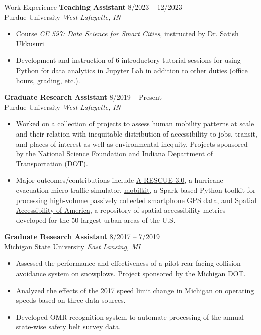 \documentclass{CV} %
\begin{document}
\begin{rSection}{Work Experience}
    {\bf Teaching Assistant} \hfill {8/2023 – 12/2023}
    \\ Purdue University \hfill {\em West Lafayette, IN}
    \begin{itemize}[noitemsep]
        \item Course {\em CE 597: Data Science for Smart Cities}, instructed by Dr. Satish Ukkusuri
        \item Development and instruction of 6 introductory tutorial sessions for using Python for data analytics in Jupyter Lab in addition to other duties (office hours, grading, etc.).
    \end{itemize}
    {\bf Graduate Research Assistant} \hfill {8/2019 – Present}
    \\ Purdue University \hfill {\em West Lafayette, IN}
    \begin{itemize}[noitemsep]
        \item Worked on a collection of projects to assess human mobility patterns at scale and their relation with inequitable distribution of accessibility to jobs, transit, and places of interest as well as environmental inequity. Projects sponsored by the National Science Foundation and Indiana Department of Transportation (DOT).
        \item Major outcomes/contributions include \href{https://umnilab.github.io/HSEES_doc/}{A-RESCUE 3.0}, a hurricane evacuation micro traffic simulator, \href{https://github.com/rvanxer/mk}{mobilkit}, a Spark-based Python toolkit for processing high-volume passively collected smartphone GPS data, and \href{https://github.com/rvanxer/spr_4711}{Spatial Accessibility of America}, a repository of spatial accessibility metrics developed for the 50 largest urban areas of the U.S.
    \end{itemize}
    {\bf Graduate Research Assistant} \hfill {8/2017 – 7/2019}
    \\ Michigan State University \hfill {\em East Lansing, MI}
    \begin{itemize}[noitemsep]
        \item Assessed the performance and effectiveness of a pilot rear-facing collision avoidance system on snowplows. Project sponsored by the Michigan DOT.
        \item Analyzed the effects of the 2017 speed limit change in Michigan on operating speeds based on three data sources.
        \item Developed OMR recognition system to automate processing of the annual state-wise safety belt survey data.

\end{itemize}
\end{rSection}
\end{document}
